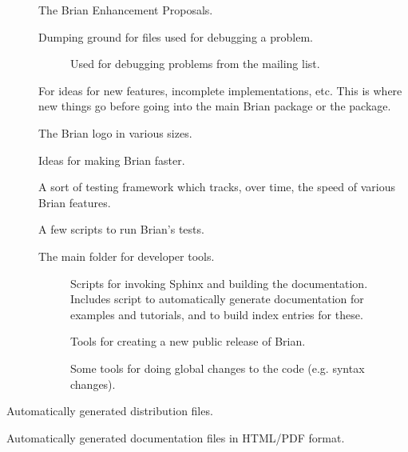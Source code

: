 \documentclass[letterpaper,10pt,english]{manual}
\begin{document}
\begin{description}
\begin{description}
\item[]
The Brian Enhancement Proposals.

\item[]
Dumping ground for files used for debugging a problem.
\begin{description}
\item[]
Used for debugging problems from the  mailing list.

\end{description}

\item[]
For ideas for new features, incomplete implementations, etc. This is
where new things go before going into the main Brian package or the
 package.

\item[]
The Brian logo in various sizes.

\item[]
Ideas for making Brian faster.

\item[]
A sort of testing framework which tracks, over time, the speed of
various Brian features.

\item[]
A few scripts to run Brian's tests.

\item[]
The main folder for developer tools.
\begin{description}
\item[]
Scripts for invoking Sphinx and building the documentation. Includes
script to automatically generate documentation for examples and
tutorials, and to build index entries for these.

\item[]
Tools for creating a new public release of Brian.

\item[]
Some tools for doing global changes to the code (e.g. syntax
changes).

\end{description}

\end{description}

\item[\code{dist}]
Automatically generated distribution files.

\item[\code{docs}]
Automatically generated documentation files in HTML/PDF format.


\end{description}
\end{document}
